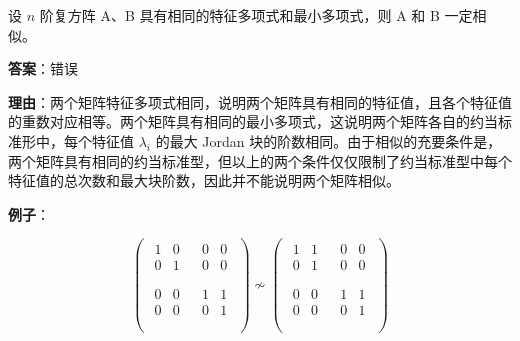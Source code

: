 \documentclass{article}
\begin{document}
\par 设 $n$ 阶复方阵 A、B 具有相同的特征多项式和最小多项式，则 A 和 B 一定相似。

\par \textbf{答案}：错误

\par \textbf{理由}：两个矩阵特征多项式相同，说明两个矩阵具有相同的特征值，且各个特征值的重数对应相等。两个矩阵具有相同的最小多项式，这说明两个矩阵各自的约当标准形中，每个特征值 $\lambda_i$ 的最大 Jordan 块的阶数相同。由于相似的充要条件是，两个矩阵具有相同的约当标准型，但以上的两个条件仅仅限制了约当标准型中每个特征值的总次数和最大块阶数，因此并不能说明两个矩阵相似。

\par \textbf{例子}：

\begin{equation*}
	\begin{pmatrix}
		\begin{matrix}
			\boxed{1} & 0\\
			0 & \boxed{1}\\
		\end{matrix} &
		\begin{matrix}
			0 & 0\\
			0 & 0\\
		\end{matrix}\\
		\begin{matrix}
			0 & 0\\
			0 & 0\\
		\end{matrix} &
		\boxed{\begin{matrix}
				1 & 1\\
				0 & 1\\
		\end{matrix}}\\
	\end{pmatrix} \nsim
	\begin{pmatrix}
		\boxed{\begin{matrix}
				1 & 1\\
				0 & 1\\
		\end{matrix}}&
		\begin{matrix}
			0 & 0\\
			0 & 0\\
		\end{matrix}\\
		\begin{matrix}
			0 & 0\\
			0 & 0\\
		\end{matrix}&
		\boxed{\begin{matrix}
			1 & 1\\
			0 & 1\\
		\end{matrix}}\\
	\end{pmatrix}
\end{equation*}
\end{document}
